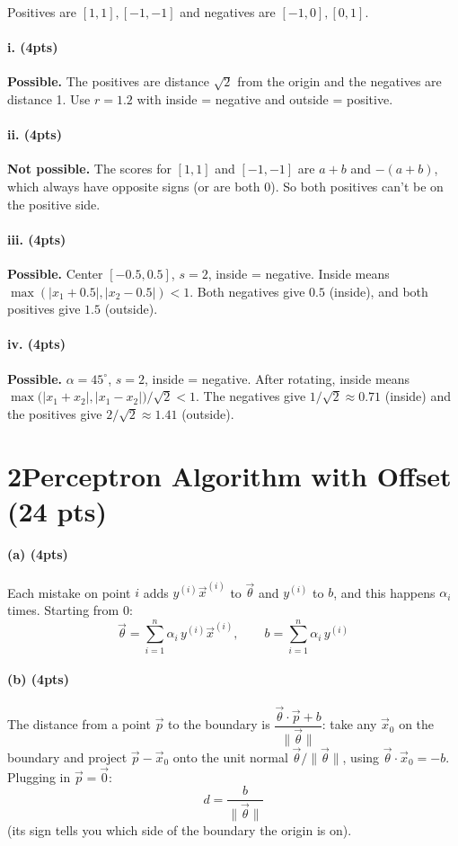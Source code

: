 \documentclass[11pt]{article}
\newcommand{\vth}{\vec\theta}
\newcommand{\x}[1]{\vec x^{(#1)}}
\begin{document}
\noindent Positives are $[1,1],[-1,-1]$ and negatives are $[-1,0],[0,1]$.

\paragraph{i. (4pts)} \textbf{Possible.} The positives are distance $\sqrt2$ from the origin and the negatives are distance 1. Use $r=1.2$ with inside = negative and outside = positive.

\paragraph{ii. (4pts)} \textbf{Not possible.} The scores for $[1,1]$ and $[-1,-1]$ are $a+b$ and $-(a+b)$, which always have opposite signs (or are both 0). So both positives can't be on the positive side.

\paragraph{iii. (4pts)} \textbf{Possible.} Center $[-0.5,0.5]$, $s=2$, inside = negative. Inside means $\max(|x_1+0.5|,|x_2-0.5|)<1$. Both negatives give $0.5$ (inside), and both positives give $1.5$ (outside).

\paragraph{iv. (4pts)} \textbf{Possible.} $\alpha=45^\circ$, $s=2$, inside = negative. After rotating, inside means $\max\big(|x_1+x_2|,|x_1-x_2|\big)/\sqrt2<1$. The negatives give $1/\sqrt2\approx0.71$ (inside) and the positives give $2/\sqrt2\approx1.41$ (outside).

\section*{2\quad Perceptron Algorithm with Offset (24 pts)}

\paragraph{(a) (4pts)} Each mistake on point $i$ adds $y^{(i)}\x i$ to $\vth$ and $y^{(i)}$ to $b$, and this happens $\alpha_i$ times. Starting from 0:
\[
\vth=\sum_{i=1}^{n}\alpha_i\,y^{(i)}\x i,\qquad b=\sum_{i=1}^{n}\alpha_i\,y^{(i)}
\]

\paragraph{(b) (4pts)} The distance from a point $\vec p$ to the boundary is $\dfrac{\vth\cdot\vec p+b}{\|\vth\|}$: take any $\vec x_0$ on the boundary and project $\vec p-\vec x_0$ onto the unit normal $\vth/\|\vth\|$, using $\vth\cdot\vec x_0=-b$. Plugging in $\vec p=\vec 0$:
\[
d=\frac{b}{\|\vth\|}
\]
(its sign tells you which side of the boundary the origin is on).
\end{document}
